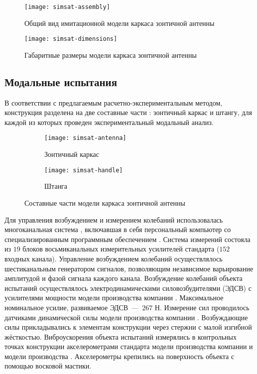 \begin{figure}[!htb]
	\centerfloat
	\texttt{[image: simsat-assembly]}
	\caption{Общий вид имитационной модели каркаса зонтичной антенны} \label{fig:simsat-assembly}
\end{figure}

\begin{figure}[!htb]
	\centerfloat
	\texttt{[image: simsat-dimensions]}
	\caption{Габаритные размеры модели каркаса зонтичной антенны} \label{fig:simsat-dimensions}
\end{figure}

\subsection{Модальные испытания}

В соответствии с предлагаемым расчетно-экспериментальным методом, конструкция разделена на две составные части : зонтичный каркас и штангу, для каждой из которых проведен экспериментальный модальный анализ.

\begin{figure}[!htb]
	\centering
	\begin{subfigure}[t]{0.48\textwidth}
		\centering
		\texttt{[image: simsat-antenna]}
		\caption{Зонтичный каркас}
	\end{subfigure}
	\hfill
	\begin{subfigure}[t]{0.48\textwidth}
		\centering
		\texttt{[image: simsat-handle]}
		\caption{Штанга}
	\end{subfigure}	
	\caption{Составные части модели каркаса зонтичной антенны} \label{fig:simsat-parts}
\end{figure}

Для управления возбуждением и измерением колебаний использовалась многоканальная система  , включавшая в себя персональный компьютер со специализированным программным обеспечением . Система измерений состояла из $ 19 $ блоков восьмиканальных измерительных усилителей стандарта  ($ 152 $ входных канала). Управление возбуждением колебаний осуществлялось шестиканальным генератором сигналов, позволяющим независимое варьирование амплитудой и фазой сигнала каждого канала. Возбуждение колебаний объекта испытаний осуществлялось электродинамическими силовозбудителями (ЭДСВ)  с усилителями мощности модели   производства компании  . Максимальное номинальное усилие, развиваемое ЭДСВ~---~$ 267 $ Н. Измерение сил проводилось датчиками динамической силы модели  производства компании . Возбуждающие силы прикладывались к элементам конструкции через стержни с малой изгибной жёсткостью. Виброускорения объекта испытаний измерялись в контрольных точках конструкции акселерометрами стандарта  модели  производства компании  и модели  производства  . Акселерометры крепились на поверхность объекта с помощью восковой мастики.

